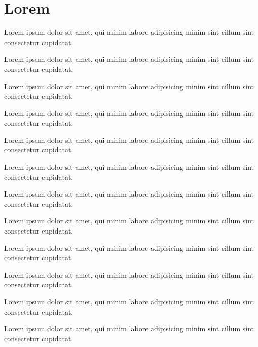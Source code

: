 \documentclass[type=bachelor]{bithesis}
\begin{document}
\chapter{Lorem}

\begin{algo}[Lorem]
  \label{algo}
  Lorem ipsum dolor sit amet, qui minim labore adipisicing minim sint cillum sint consectetur cupidatat.
\end{algo}

\begin{them}[Lorem]
  \label{them}
  Lorem ipsum dolor sit amet, qui minim labore adipisicing minim sint cillum sint consectetur cupidatat.
\end{them}

\begin{lem}[Lorem]
  \label{lem}
  Lorem ipsum dolor sit amet, qui minim labore adipisicing minim sint cillum sint consectetur cupidatat.
\end{lem}

\begin{prop}[Lorem]
  \label{prop}
  Lorem ipsum dolor sit amet, qui minim labore adipisicing minim sint cillum sint consectetur cupidatat.
\end{prop}
\begin{cor}[Lorem]
  \label{cor}
  Lorem ipsum dolor sit amet, qui minim labore adipisicing minim sint cillum sint consectetur cupidatat.
\end{cor}
\begin{axi}[Lorem]
  \label{axi}
  Lorem ipsum dolor sit amet, qui minim labore adipisicing minim sint cillum sint consectetur cupidatat.
\end{axi}
\begin{assm}[Lorem]
  \label{assm}
  Lorem ipsum dolor sit amet, qui minim labore adipisicing minim sint cillum sint consectetur cupidatat.
\end{assm}
\begin{defn}[Lorem]
  \label{defn}
  Lorem ipsum dolor sit amet, qui minim labore adipisicing minim sint cillum sint consectetur cupidatat.
\end{defn}
\begin{conj}[Lorem]
  \label{conj}
  Lorem ipsum dolor sit amet, qui minim labore adipisicing minim sint cillum sint consectetur cupidatat.
\end{conj}
\begin{exmp}[Lorem]
  \label{exmp}
  Lorem ipsum dolor sit amet, qui minim labore adipisicing minim sint cillum sint consectetur cupidatat.
\end{exmp}
\begin{case}[Lorem]
  \label{case}
  Lorem ipsum dolor sit amet, qui minim labore adipisicing minim sint cillum sint consectetur cupidatat.
\end{case}
\begin{rem}[Lorem]
  \label{rem}
  Lorem ipsum dolor sit amet, qui minim labore adipisicing minim sint cillum sint consectetur cupidatat.
\end{rem}
\end{document}
